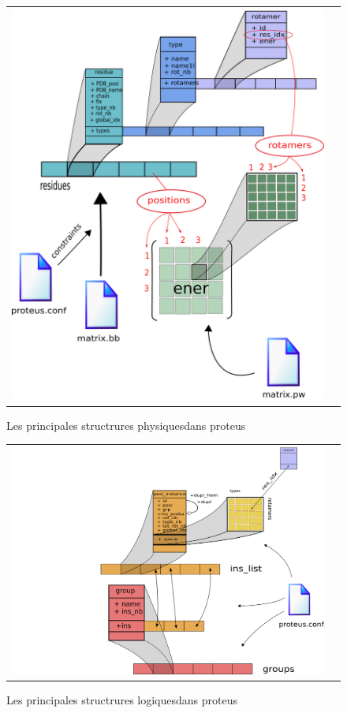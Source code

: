    \begin{figure}[t]
     \centering
     \begin{tabular}{cc}
       \includegraphics[width=12cm]{graphe/proteus/structures_physique.png} &
     \end{tabular}
     
     \caption{Les principales structrures \og physiques\fg dans proteus}
\label{graph:struct_Phy}
   \end{figure}



   \begin{figure}[t]
     \centering
     \begin{tabular}{cc}
       \includegraphics[width=12cm]{graphe/proteus/structures_modele_logique.png} &
     \end{tabular}
     
     \caption{Les principales structrures \og logiques\fg dans proteus}
\label{graph:struct_log}
   \end{figure}



